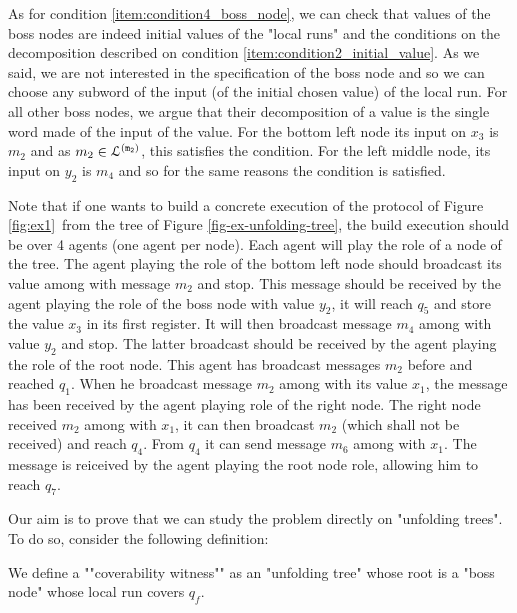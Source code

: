 \begin{example}
	As for condition \ref{item:condition4_boss_node}, we can check that values of the boss nodes are indeed initial values of the "local runs" and the conditions on the decomposition described on condition \ref{item:condition2_initial_value}. As we said, we are not interested in the specification of the boss node and so we can choose any subword of the input (of the initial chosen value) of the local run. For all other boss nodes, we argue that their decomposition of a value is the single word made of the input of the value. For the bottom left node its input on $x_3$ is $m_2$ and as $m_2 \in \mathcal{L}^{\mathtt{(m_2)}}$, this satisfies the condition. For the left middle node, its input on $y_2$ is $m_4$ and so for the same reasons the condition is satisfied.
	
	
	
	
	Note that if one wants to build a concrete execution of the protocol of Figure \ref{fig:ex1}~from the tree of Figure \ref{fig-ex-unfolding-tree}, the build execution should be over 4 agents (one agent per node). Each agent will play the role of a node of the tree. The agent playing the role of the bottom left node should broadcast its value among with message $m_2$ and stop. This message should be received by the agent playing the role of the boss node with value $y_2$, it will reach $q_5$ and store the value $x_3$ in its first register. It will then broadcast message $m_4$ among with value $y_2$ and stop. The latter broadcast should be received by the agent playing the role of the root node. This agent has broadcast messages $m_2$ before and reached $q_1$. When he broadcast message $m_2$ among with its value $x_1$, the message has been received by the agent playing role of the right node.
	The right node received $m_2$ among with $x_1$, it can then broadcast $m_2$ (which shall not be received) and reach $q_4$. From $q_4$ it can send message $m_6$ among with $x_1$. The message is reiceived by the agent playing the root node role, allowing him to reach $q_7$.
	
	
	

\end{example}


Our aim is to prove that we can study the \COVER problem directly on "unfolding trees". To do so, consider the following definition: 

\begin{definition}
\label{def:cov_witness}
We define a ""coverability witness"" as an "unfolding tree" whose root is a "boss node" whose local run covers $q_f$. 
\end{definition}

